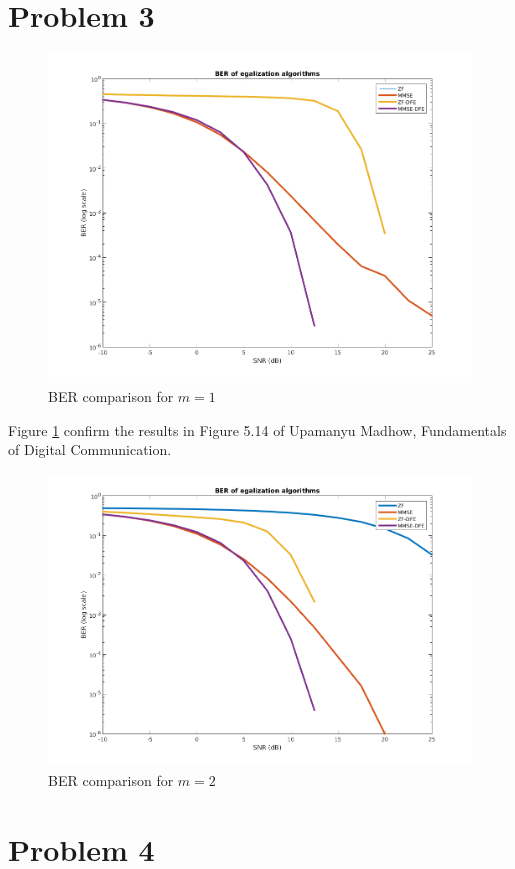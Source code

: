 \documentclass[a4paper]{article}
\begin{document}
\section{Problem 3}

\begin{figure}[ht!]
\centering
\begin{center}
\includegraphics[scale=0.50]{BER-m1.png}
\caption{BER comparison for $m=1$}
\label{m1}
\end{center}
\end{figure}

Figure \ref{m1} confirm the results in Figure 5.14 of Upamanyu Madhow, Fundamentals of Digital Communication.

\begin{figure}[ht!]
\centering
\begin{center}
\includegraphics[scale=0.50]{BER-m2.png}
\caption{BER comparison for $m=2$}
\label{m2}
\end{center}
\end{figure}
\section{Problem 4}
\end{document}
